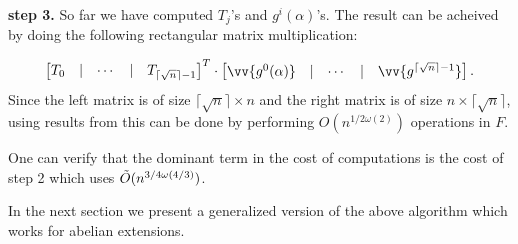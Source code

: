 \textbf{step 3.} So far we have computed $T_j$'s and $g^i(\alpha)$'s. The result can be acheived by doing the following 
rectangular matrix multiplication:

$$
\begin{bmatrix}
T_0 & \vert & \cdots & \vert &T_{\lceil \sqrt{n} \rceil -1}
\end{bmatrix}^T \cdot
\begin{bmatrix}
\vv{g^0(\alpha)} & \vert & \cdots & \vert & \vv{g^{\lceil \sqrt{n} \rceil -1}}
\end{bmatrix}.
$$
Since the left matrix is of size $\lceil \sqrt{n} \rceil \times n$ and the right matrix is of size $n \times \lceil \sqrt{n} \rceil$,
using results from \cite{LeGall} this can be done by performing $O(n^{1/2\omega(2)})$ operations in $F$.

One can verify that the dominant term in the cost of computations is the cost of step 2 which uses $\tilde{O}(n^{3/4 \omega(4/3)})$.


In the next section
we present a generalized version of the above algorithm which works for abelian extensions.

